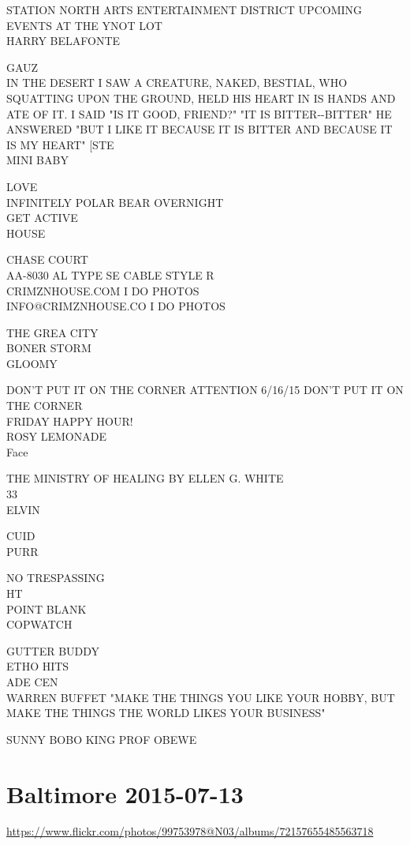 \documentclass[10pt,letterpaper]{article}
\begin{document}
STATION NORTH ARTS ENTERTAINMENT DISTRICT UPCOMING EVENTS AT THE YNOT LOT\\
HARRY BELAFONTE

GAUZ\\
IN THE DESERT I SAW A CREATURE, NAKED, BESTIAL, WHO SQUATTING UPON THE GROUND, HELD HIS HEART IN IS HANDS AND ATE OF IT.  I SAID "IS IT GOOD, FRIEND?"  "IT IS BITTER{-}{-}BITTER" HE ANSWERED "BUT I LIKE IT BECAUSE IT IS BITTER AND BECAUSE IT IS MY HEART" {[}STE\\
MINI BABY

LOVE\\
INFINITELY POLAR BEAR OVERNIGHT\\
GET ACTIVE\\
HOUSE

CHASE COURT\\
AA{-}8030 AL TYPE SE CABLE STYLE R\\
CRIMZNHOUSE.COM I DO PHOTOS\\
INFO@CRIMZNHOUSE.CO I DO PHOTOS

THE GREA CITY\\
BONER STORM\\
GLOOMY

DON'T PUT IT ON THE CORNER ATTENTION 6/16/15 DON'T PUT IT ON THE CORNER\\
FRIDAY HAPPY HOUR!\\
ROSY LEMONADE\\
Face

THE MINISTRY OF HEALING BY ELLEN G. WHITE\\
33\\
ELVIN

CUID\\
PURR

NO TRESPASSING\\
HT\\
POINT BLANK\\
COPWATCH

GUTTER BUDDY\\
ETHO HITS\\
ADE CEN\\
WARREN BUFFET "MAKE THE THINGS YOU LIKE YOUR HOBBY, BUT MAKE THE THINGS THE WORLD LIKES YOUR BUSINESS"

SUNNY BOBO KING PROF OBEWE


\section*{Baltimore 2015-07-13}

\url{https://www.flickr.com/photos/99753978@N03/albums/72157655485563718}
\end{document}
